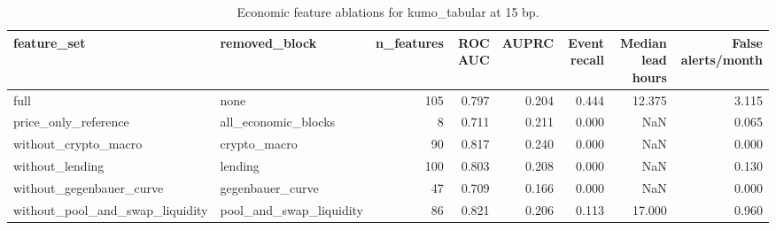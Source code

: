 \begin{table}
\caption{Economic feature ablations for kumo_tabular at 15 bp.}
\label{tab:ablation_15_kumo_tabular}
\begin{tabular}{llrrrrrr}
\toprule
feature\_set & removed\_block & n\_features & ROC AUC & AUPRC & Event recall & Median lead hours & False alerts/month \\
\midrule
full & none & 105 & 0.797 & 0.204 & 0.444 & 12.375 & 3.115 \\
price\_only\_reference & all\_economic\_blocks & 8 & 0.711 & 0.211 & 0.000 & NaN & 0.065 \\
without\_crypto\_macro & crypto\_macro & 90 & 0.817 & 0.240 & 0.000 & NaN & 0.000 \\
without\_lending & lending & 100 & 0.803 & 0.208 & 0.000 & NaN & 0.130 \\
without\_gegenbauer\_curve & gegenbauer\_curve & 47 & 0.709 & 0.166 & 0.000 & NaN & 0.000 \\
without\_pool\_and\_swap\_liquidity & pool\_and\_swap\_liquidity & 86 & 0.821 & 0.206 & 0.113 & 17.000 & 0.960 \\
\bottomrule
\end{tabular}
\end{table}
